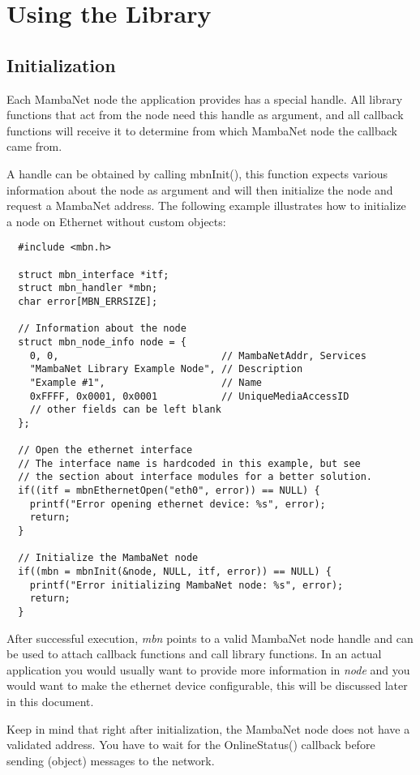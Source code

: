 \chapter{Using the Library}
\section{Initialization}
Each MambaNet node the application provides has a special handle. All library functions that act from the node need this handle as argument, and all callback functions will receive it to determine from which MambaNet node the callback came from.

A handle can be obtained by calling mbnInit(), this function expects various information about the node as argument and will then initialize the node and request a MambaNet address. The following example illustrates how to initialize a node on Ethernet without custom objects:
\begin{verbatim}
  #include <mbn.h>

  struct mbn_interface *itf;
  struct mbn_handler *mbn;
  char error[MBN_ERRSIZE];

  // Information about the node
  struct mbn_node_info node = {
    0, 0,                            // MambaNetAddr, Services
    "MambaNet Library Example Node", // Description
    "Example #1",                    // Name
    0xFFFF, 0x0001, 0x0001           // UniqueMediaAccessID
    // other fields can be left blank
  };

  // Open the ethernet interface
  // The interface name is hardcoded in this example, but see
  // the section about interface modules for a better solution.
  if((itf = mbnEthernetOpen("eth0", error)) == NULL) {
    printf("Error opening ethernet device: %s", error);
    return;
  }

  // Initialize the MambaNet node
  if((mbn = mbnInit(&node, NULL, itf, error)) == NULL) {
    printf("Error initializing MambaNet node: %s", error);
    return;
  }
\end{verbatim}

After successful execution, \textit{mbn} points to a valid MambaNet node handle and can be used to attach callback functions and call library functions. In an actual application you would usually want to provide more information in \textit{node} and you would want to make the ethernet device configurable, this will be discussed later in this document.

Keep in mind that right after initialization, the MambaNet node does not have a validated address. You have to wait for the OnlineStatus() callback before sending (object) messages to the network.

